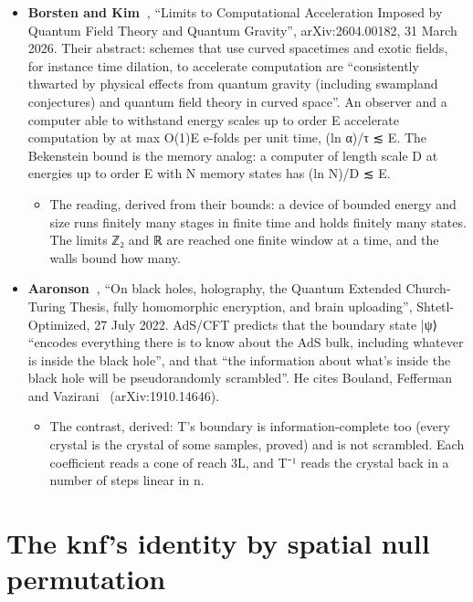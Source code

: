 \begin{itemize}
\item \textbf{Borsten and Kim~\cite{src:Borsten-and-Kim-2026}}, “Limits to Computational Acceleration Imposed by Quantum Field Theory and Quantum Gravity”, arXiv:2604.00182, 31 March 2026. Their abstract: schemes that use curved spacetimes and exotic fields, for instance time dilation, to accelerate computation are “consistently thwarted by physical effects from quantum gravity (including swampland conjectures) and quantum field theory in curved space”. An observer and a computer able to withstand energy scales up to order E accelerate computation by at max O(1)E e-folds per unit time, (ln α)/τ ≲ E. The Bekenstein bound is the memory analog: a computer of length scale D at energies up to order E with N memory states has (ln N)/D ≲ E.

\begin{itemize}
\item The reading, derived from their bounds: a device of bounded energy and size runs finitely many stages in finite time and holds finitely many states. The limits ℤ₂ and ℝ are reached one finite window at a time, and the walls bound how many.
\end{itemize}
\item \textbf{Aaronson~\cite{src:Aaronson-2022}}, “On black holes, holography, the Quantum Extended Church-Turing Thesis, fully homomorphic encryption, and brain uploading”, Shtetl-Optimized, 27 July 2022. AdS/CFT predicts that the boundary state |ψ⟩ “encodes everything there is to know about the AdS bulk, including whatever is inside the black hole”, and that “the information about what's inside the black hole will be pseudorandomly scrambled”. He cites Bouland, Fefferman and Vazirani~\cite{src:Bouland-2019} (arXiv:1910.14646).

\begin{itemize}
\item The contrast, derived: T's boundary is information-complete too (every crystal is the crystal of some samples, proved) and is not scrambled. Each coefficient reads a cone of reach 3L, and T⁻¹ reads the crystal back in a number of steps linear in n.
\end{itemize}
\end{itemize}

\section{\texorpdfstring{The knf's identity by spatial null permutation}{The knf's identity by spatial null permutation}}

